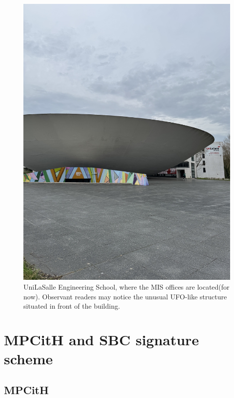 \documentclass[english]{article}
\begin{document}
		\begin{figure}[H]
			\begin{center}
				\includegraphics[scale=0.04]{unilasalle.jpg}
				\caption{UniLaSalle Engineering School, where the MIS offices are located(for now). Observant readers may notice the unusual UFO-like structure situated in front of the building.}
			\end{center}	
		\end{figure}
	
	\newpage
	\tableofcontents
	\newpage
	\section{MPCitH and SBC signature scheme}\label{sec2}
		
		\subsection{MPCitH}
		
\end{document}

